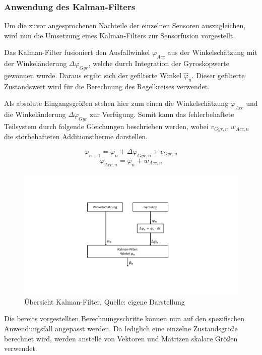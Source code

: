 \subsubsection{Anwendung des Kalman-Filters}
Um die zuvor angesprochenen Nachteile der einzelnen Sensoren auszugleichen, wird nun die Umsetzung eines Kalman-Filters zur Sensorfusion vorgestellt.

Das Kalman-Filter fusioniert den Ausfallwinkel $\varphi_{Acc}$ aus der Winkelschätzung mit der Winkeländerung $\Delta \varphi_{Gyr}$, welche durch Integration der Gyroskopwerte gewonnen wurde. Daraus ergibt sich der gefilterte Winkel $\hat{\varphi}_n$. Dieser gefilterte Zustandswert wird für die Berechnung des Regelkreises verwendet.

Als absolute Eingangsgrößen stehen hier zum einen die Winkelschätzung $\varphi_{Acc}$ und die Winkeländerung $\Delta \varphi_{Gyr}$ zur Verfügung. Somit kann das fehlerbehaftete Teilsystem durch folgende Gleichungen beschrieben werden, wobei $v_{Gyr,n}$ $w_{Acc,n}$ die störbehafteten Additionstherme darstellen.

\begin{equation}
\varphi_{n+1} = \varphi_{n} + \Delta \varphi_{Gyr,n} + v_{Gyr,n}
\end{equation}
\begin{equation}
\varphi_{Acc,n} = \varphi_n + w_{Acc,n}
\end{equation}


\newpage
\begin{figure}[h!]
\centering
\includegraphics[width=\linewidth, trim={0 3.5cm 0 3.5cm},clip]{img/Kalman_overview}
\caption{Übersicht Kalman-Filter, Quelle: eigene Darstellung}
\end{figure}

Die bereits vorgestellten Berechnungsschritte können nun auf den spezifischen Anwendungsfall angepasst werden. Da lediglich eine einzelne Zustandsgröße berechnet wird, werden anstelle von Vektoren und Matrizen skalare Größen verwendet.


